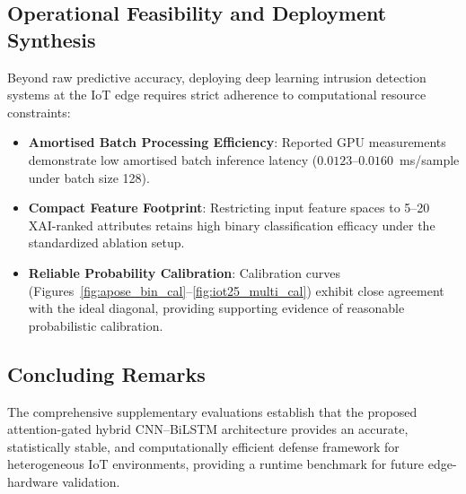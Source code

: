 \documentclass[a4paper,fleqn]{cas-sc}
\begin{document}
\subsection{Operational Feasibility and Deployment Synthesis}
Beyond raw predictive accuracy, deploying deep learning intrusion detection systems at the IoT edge requires strict adherence to computational resource constraints:
\begin{itemize}\setlength{\itemsep}{1pt}\setlength{\parskip}{0pt}
    \item \textbf{Amortised Batch Processing Efficiency}: Reported GPU measurements demonstrate low amortised batch inference latency ($0.0123$--$0.0160$~ms/sample under batch size 128).
    \item \textbf{Compact Feature Footprint}: Restricting input feature spaces to 5--20 XAI-ranked attributes retains high binary classification efficacy under the standardized ablation setup.
    \item \textbf{Reliable Probability Calibration}: Calibration curves (Figures~\ref{fig:apose_bin_cal}--\ref{fig:iot25_multi_cal}) exhibit close agreement with the ideal diagonal, providing supporting evidence of reasonable probabilistic calibration.
\end{itemize}

\subsection{Concluding Remarks}
The comprehensive supplementary evaluations establish that the proposed attention-gated hybrid CNN--BiLSTM architecture provides an accurate, statistically stable, and computationally efficient defense framework for heterogeneous IoT environments, providing a runtime benchmark for future edge-hardware validation.
\end{document}
